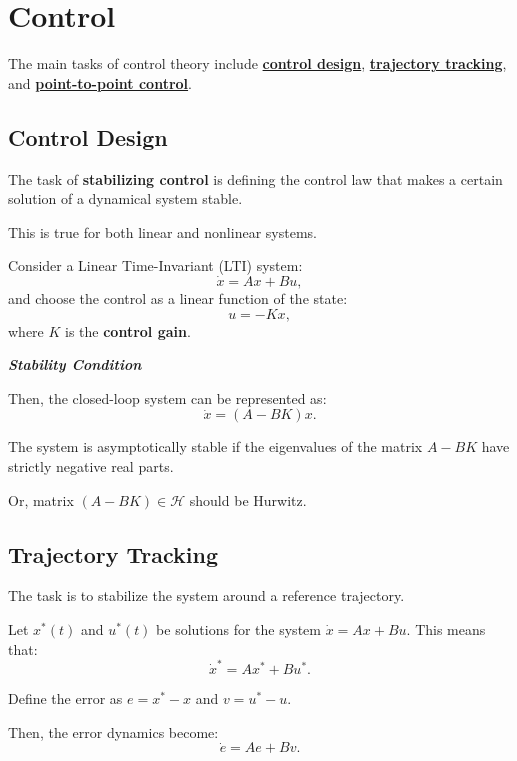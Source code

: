 \section{Control}

The main tasks of control theory include \textbf{\underline{control design}}, \textbf{\underline{trajectory tracking}}, and \textbf{\underline{point-to-point control}}.


\subsection{Control Design}

\begin{tcolorbox}[colback=green!10,colframe=green!50!black,title=\textbf{Stabilizing control}]
    The task of \textbf{stabilizing control} is defining the control law that makes a certain solution of 
    a dynamical system stable.
\end{tcolorbox}

This is true for both linear and nonlinear systems.

Consider a Linear Time-Invariant (LTI) system:
\[\dot{x} = Ax + Bu,\]
and choose the control as a linear function of the state:
\[u = -Kx,\] where \(K\) is the \textbf{control gain}.

\begin{center}
    \textbf{\textit{Stability Condition}}
\end{center}

Then, the closed-loop system can be represented as:
\[\dot{x} = (A - BK)x.\]

The system is asymptotically stable if the eigenvalues of the matrix \(A - BK\) have strictly negative real parts.

Or, matrix $(A-BK) \in \mathcal{H}$ should be Hurwitz. 

\subsection{Trajectory Tracking}

The task is to stabilize the system around a reference trajectory.

Let \(x^*(t)\) and \(u^*(t)\) be solutions for the system \(\dot{x} = Ax + Bu\). This means that:
\[\dot{x}^* = Ax^* + Bu^*.\]

Define the error as \(e = x^* - x\) and \(v = u^* - u\).

Then, the error dynamics become:
\[\dot{e} = Ae + Bv.\]

